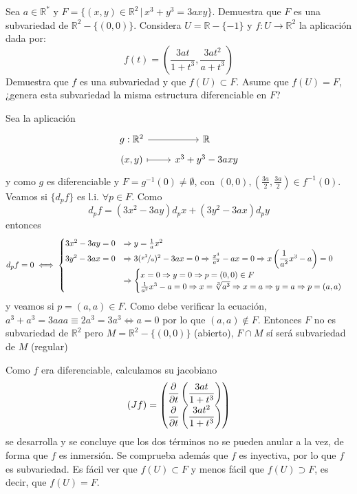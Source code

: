 \begin{ejer}
    [3.20] Sea $a\in \mathbb R^*$ y $F = \{(x, y) \in \mathbb R^2 \, | \, x^3 + y^3 = 3axy\}$. Demuestra que $F$ es una subvariedad de $\mathbb R^2 - \{(0, 0)\}$. Considera $U = \mathbb R - \{-1\}$ y $f : U \to \mathbb R^2$ la aplicaci\'on dada por: 
    $$f(t) = \left( \dfrac{3at}{1+t^3}, \dfrac{3at^2}{a+t^3} \right)$$
Demuestra que $f$ es una subvariedad y que $f(U) \subset F$. Asume que $f(U) = F$,
¿genera esta subvariedad la misma estructura diferenciable en $F$?
\end{ejer}
\begin{sol}
    Sea la aplicaci\'on
    $$ \bt g:\mathbb R^2 \arrow{r} & \mathbb R \\[-5mm] (x,y) \arrow[mapsto]{r} &  x^3 + y^3 - 3axy\et $$
    y como $g$ es diferenciable y $F=g^{-1}(0)\neq \emptyset$, con $(0,0), (\frac{3a}{2}, \frac{3a}{2}) \in f^{-1}(0)$. Veamos si $\{d_pf\}$ es l.i. $\forall p \in F$. Como
    $$d_pf=(3x^2-3ay)d_px+(3y^2-3ax)d_py$$
    entonces
    $$d_pf=0\iff \begin{cases}
        3x^2-3ay=0 & \Rightarrow y =\frac{1}{a} x^2 \\ 
        3y^2-3ax=0 & \Rightarrow 3 (\nicefrac{x^2}{a})^2-3ax=0 \Rightarrow \frac{x^4}{a^2}-ax=0 \Rightarrow x\left(\dfrac{1}{a^2}x^3-a\right)=0 \\ & \Rightarrow\begin{cases}
            x=0 \Rightarrow y=0 \Rightarrow p=(0,0) \in F\\ 
            \frac{1}{a^2} x^3 - a=0 \Rightarrow x=\sqrt[3]{a^3}\Rightarrow x=a \Rightarrow y=a \Rightarrow p=(a,a)
        \end{cases}
    \end{cases}$$
    y veamos si $p=(a,a)\in F$. Como debe verificar la ecuaci\'on, $a^3+a^3=3aaa \equiv 2a^3=3a^3 \iff a=0$ por lo que $(a,a)\nin F$. Entonces $F$ no es subvariedad de $\mathbb R^2$ pero $M=\mathbb R^2 - \{(0,0)\}$ (abierto), $F\cap M$ s\'i ser\'a subvariedad de $M$ (regular)

    Como $f$ era diferenciable, calculamos su jacobiano
    $$(Jf) = \begin{pmatrix}
        \dfrac{\partial^{} }{\partial t} \left(\dfrac{3at}{1+t^3}\right) \\ \dfrac{\partial^{} }{\partial t} \left(\dfrac{3at^2}{1+t^3}\right)
    \end{pmatrix}$$
    se desarrolla y se concluye que los dos t\'erminos no se pueden anular a la vez, de forma que $f$ es inmersi\'on. Se comprueba adem\'as que $f$ es inyectiva, por lo que $f$ es subvariedad. Es f\'acil ver que $f(U)\subset F$ y menos f\'acil que $f(U)\supset F$, es decir, que $f(U)=F$. 
\end{sol}
